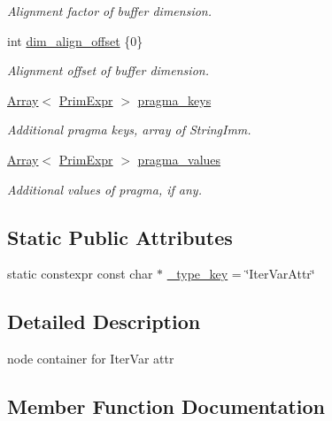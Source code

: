 \begin{DoxyCompactItemize}
\begin{DoxyCompactList}\small\item\em Alignment factor of buffer dimension. \end{DoxyCompactList}\item 
int \hyperlink{classtvm_1_1te_1_1IterVarAttrNode_aa75bbe1b6c521352553752261a1b6f50}{dim\+\_\+align\+\_\+offset} \{0\}
\begin{DoxyCompactList}\small\item\em Alignment offset of buffer dimension. \end{DoxyCompactList}\item 
\hyperlink{classtvm_1_1Array}{Array}$<$ \hyperlink{classtvm_1_1PrimExpr}{Prim\+Expr} $>$ \hyperlink{classtvm_1_1te_1_1IterVarAttrNode_a0bcbe78c8ad2fec77112b3156bfe0d81}{pragma\+\_\+keys}
\begin{DoxyCompactList}\small\item\em Additional pragma keys, array of String\+Imm. \end{DoxyCompactList}\item 
\hyperlink{classtvm_1_1Array}{Array}$<$ \hyperlink{classtvm_1_1PrimExpr}{Prim\+Expr} $>$ \hyperlink{classtvm_1_1te_1_1IterVarAttrNode_aea7a6bc44a7ddca46c76c666eba37b7f}{pragma\+\_\+values}
\begin{DoxyCompactList}\small\item\em Additional values of pragma, if any. \end{DoxyCompactList}\end{DoxyCompactItemize}
\subsection*{Static Public Attributes}
\begin{DoxyCompactItemize}
\item 
static constexpr const char $\ast$ \hyperlink{classtvm_1_1te_1_1IterVarAttrNode_a8a6b46b9439788daf1dd83f515312439}{\+\_\+type\+\_\+key} = \char`\"{}Iter\+Var\+Attr\char`\"{}
\end{DoxyCompactItemize}


\subsection{Detailed Description}
node container for Iter\+Var attr 

\subsection{Member Function Documentation}
